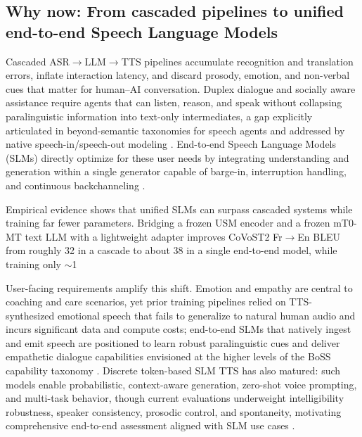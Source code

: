 \documentclass{article}
\begin{document}

\subsection{Why now: From cascaded pipelines to unified end-to-end Speech Language Models} \label{subsec:Why now: From cascaded pipelines to unified end-to-end Speech Language Models}

Cascaded ASR$\rightarrow$LLM$\rightarrow$TTS pipelines accumulate recognition and translation errors, inflate interaction latency, and discard prosody, emotion, and non-verbal cues that matter for human--AI conversation. Duplex dialogue and socially aware assistance require agents that can listen, reason, and speak without collapsing paralinguistic information into text-only intermediates, a gap explicitly articulated in beyond-semantic taxonomies for speech agents and addressed by native speech-in/speech-out modeling . End-to-end Speech Language Models (SLMs) directly optimize for these user needs by integrating understanding and generation within a single generator capable of barge-in, interruption handling, and continuous backchanneling \cite{ma2024languagemodelcanlistenwhilespeaking}.



Empirical evidence shows that unified SLMs can surpass cascaded systems while training far fewer parameters. Bridging a frozen USM encoder and a frozen mT0-MT text LLM with a lightweight adapter improves CoVoST2 Fr$\rightarrow$En BLEU from roughly 32 in a cascade to about 38 in a single end-to-end model, while training only $\sim$1%



User-facing requirements amplify this shift. Emotion and empathy are central to coaching and care scenarios, yet prior training pipelines relied on TTS-synthesized emotional speech that fails to generalize to natural human audio and incurs significant data and compute costs; end-to-end SLMs that natively ingest and emit speech are positioned to learn robust paralinguistic cues and deliver empathetic dialogue capabilities envisioned at the higher levels of the BoSS capability taxonomy . Discrete token-based SLM TTS has also matured: such models enable probabilistic, context-aware generation, zero-shot voice prompting, and multi-task behavior, though current evaluations underweight intelligibility robustness, speaker consistency, prosodic control, and spontaneity, motivating comprehensive end-to-end assessment aligned with SLM use cases \cite{wang2024evaluatingtextspeechsynthesislargediscre}.
\end{document}
